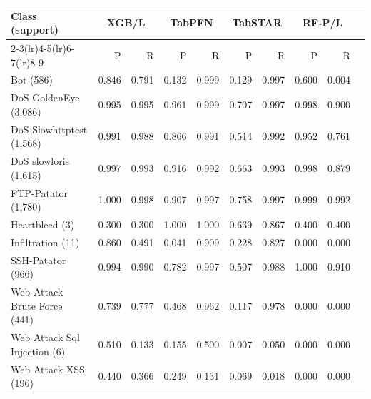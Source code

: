 \begin{tabular}{@{}lrrrrrrrrr@{}}
\toprule
Class (support) & \multicolumn{2}{c}{XGB/L} & \multicolumn{2}{c}{TabPFN} & \multicolumn{2}{c}{TabSTAR} & \multicolumn{2}{c}{RF-P/L} \\
\cmidrule(lr){2-3}\cmidrule(lr){4-5}\cmidrule(lr){6-7}\cmidrule(lr){8-9}
 & P & R & P & R & P & R & P & R \\
\midrule
Bot (586) & 0.846 & 0.791 & 0.132 & 0.999 & 0.129 & 0.997 & 0.600 & 0.004 \\
DoS GoldenEye (3,086) & 0.995 & 0.995 & 0.961 & 0.999 & 0.707 & 0.997 & 0.998 & 0.900 \\
DoS Slowhttptest (1,568) & 0.991 & 0.988 & 0.866 & 0.991 & 0.514 & 0.992 & 0.952 & 0.761 \\
DoS slowloris (1,615) & 0.997 & 0.993 & 0.916 & 0.992 & 0.663 & 0.993 & 0.998 & 0.879 \\
FTP-Patator (1,780) & 1.000 & 0.998 & 0.907 & 0.997 & 0.758 & 0.997 & 0.999 & 0.992 \\
Heartbleed (3) & 0.300 & 0.300 & 1.000 & 1.000 & 0.639 & 0.867 & 0.400 & 0.400 \\
Infiltration (11) & 0.860 & 0.491 & 0.041 & 0.909 & 0.228 & 0.827 & 0.000 & 0.000 \\
SSH-Patator (966) & 0.994 & 0.990 & 0.782 & 0.997 & 0.507 & 0.988 & 1.000 & 0.910 \\
Web Attack  Brute Force (441) & 0.739 & 0.777 & 0.468 & 0.962 & 0.117 & 0.978 & 0.000 & 0.000 \\
Web Attack  Sql Injection (6) & 0.510 & 0.133 & 0.155 & 0.500 & 0.007 & 0.050 & 0.000 & 0.000 \\
Web Attack  XSS (196) & 0.440 & 0.366 & 0.249 & 0.131 & 0.069 & 0.018 & 0.000 & 0.000 \\
\bottomrule
\end{tabular}
